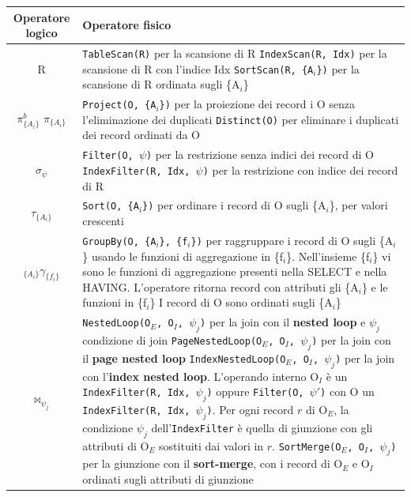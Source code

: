 \documentclass[10pt]{book}
\begin{document}
\begin{tabular}{c | l}
\textbf{Operatore logico} & \textbf{Operatore fisico}\\
\hline
R & \makecell[l]{\texttt{TableScan(R)} per la scansione di R\\\texttt{IndexScan(R, Idx)} per la scansione di R con l'indice Idx\\\texttt{SortScan(R, \{A$_i$\})} per la scansione di R ordinata sugli \{A$_i$\}}\\
\hline
\makecell{$\pi^b_{\{A_i\}}$\\$\pi_{\{A_i\}}$} & \makecell[l]{\texttt{Project(O, \{A$_i$\})} per la proiezione dei record i O senza l'eliminazione dei duplicati\\\texttt{Distinct(O)} per eliminare i duplicati dei record ordinati da O}\\
\hline
$\sigma_\psi$ & \makecell[l]{\texttt{Filter(O, $\psi$)} per la restrizione senza indici dei record di O\\\texttt{IndexFilter(R, Idx, $\psi$)} per la restrizione con indice dei record di R}\\
\hline
$\tau_{\{A_i\}}$ & \texttt{Sort(O, \{A$_i$\})} per ordinare i record di O sugli \{A$_i$\}, per valori crescenti\\
\hline
$_{\{A_i\}}\gamma_{\{f_i\}}$ & \makecell[l]{\texttt{GroupBy(O, \{A$_i$\}, \{f$_i$\})} per raggruppare i record di O sugli \{A$_i$\} usando le\\funzioni di aggregazione in \{f$_i$\}.\\
Nell'insieme \{f$_i$\} vi sono le funzioni di aggregazione presenti nella SELECT e nella HAVING.\\L'operatore ritorna record con attributi gli \{A$_i$\} e le funzioni in \{f$_i$\}\\I record di O sono ordinati sugli \{A$_i$\}}\\
\hline
$\bowtie_{\psi_j}$ & \makecell[l]{\texttt{NestedLoop(O$_E$, O$_I$, $\psi_j$)} per la join con il \textbf{nested loop} e $\psi_j$ condizione di join\\\texttt{PageNestedLoop(O$_E$, O$_I$, $\psi_j$)} per la join con il \textbf{page nested loop}\\\texttt{IndexNestedLoop(O$_E$, O$_I$, $\psi_j$)} per la join con l'\textbf{index nested loop}. L'operando interno O$_I$\\è un \texttt{IndexFilter(R, Idx, $\psi_j$)} oppure \texttt{Filter(O, $\psi'$)} con O un \texttt{IndexFilter(R, Idx, $\psi_j$)}.\\Per ogni record $r$ di O$_E$, la condizione $\psi_j$ dell'\texttt{IndexFilter} è quella di giunzione con\\gli attributi di O$_E$ sostituiti dai valori in $r$.\\\texttt{SortMerge(O$_E$, O$_I$, $\psi_j$)} per la giunzione con il \textbf{sort-merge}, con i record di O$_E$ e O$_I$ ordinati\\ sugli attributi di giunzione}
\end{tabular}
\pagebreak
\end{document}
